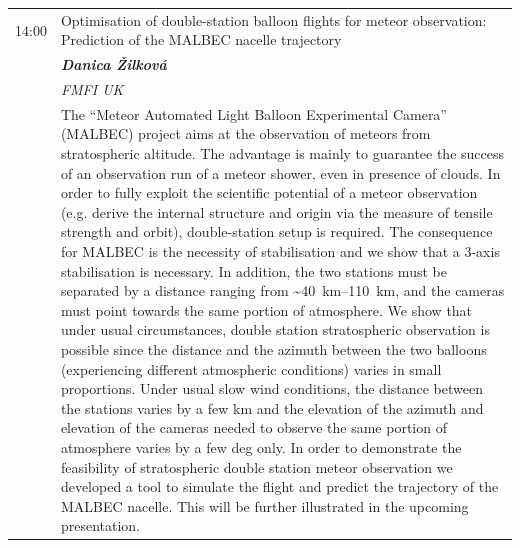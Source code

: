 \documentclass[a4paper]{report}
\begin{document}
        \begin{tabularx}{\textwidth}{>{}p{2cm} >{\RaggedRight}X}
            \toprule
                            {\Large 14:00} & {\Large Optimisation of double-station balloon flights for meteor observation: Prediction of the MALBEC nacelle trajectory} \\
                                            & \textit{\textbf{Danica Žilková}} \\
                                                                & \textit{FMFI UK} \\
                                                                & The “Meteor Automated Light Balloon Experimental Camera” (MALBEC) project aims at the observation of meteors from stratospheric altitude. The advantage is mainly to guarantee the success of an observation run of a meteor shower, even in presence of clouds. In order to fully exploit the scientific potential of a meteor observation (e.g. derive the internal structure and origin via the measure of tensile strength and orbit), double-station setup is required. The consequence for MALBEC is the necessity of stabilisation and we show that a 3-axis stabilisation is necessary. In addition, the two stations must be separated by a distance ranging from \textasciitilde\SIrange{40}{110}{\kilo\metre}, and the cameras must point towards the same portion of atmosphere. We show that under usual circumstances, double station stratospheric observation is possible since the distance and the azimuth between the two balloons (experiencing different atmospheric conditions) varies in small proportions. Under usual slow wind conditions, the distance between the stations varies by a few km and the elevation of the azimuth and elevation of the cameras needed to observe the same portion of atmosphere varies by a few deg only. In order to demonstrate the feasibility of stratospheric double station meteor observation we developed a tool to simulate the flight and predict the trajectory of the MALBEC nacelle. This will be further illustrated in the upcoming presentation.
 \\
                                                                \bottomrule
        \end{tabularx}
\end{document}
